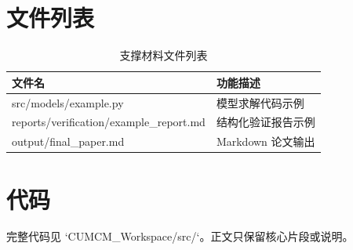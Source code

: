 \documentclass[UTF8,a4paper,12pt]{ctexart}
\begin{document}
\begin{appendices}

\section{文件列表}
\begin{table}[H]
\centering
\caption{支撑材料文件列表}
\begin{tabularx}{\textwidth}{lX}
\toprule
文件名 & 功能描述 \\
\midrule
src/models/example.py & 模型求解代码示例 \\
reports/verification/example_report.md & 结构化验证报告示例 \\
output/final_paper.md & Markdown 论文输出 \\
\bottomrule
\end{tabularx}
\label{tab:file-list}
\end{table}

\section{代码}
完整代码见 `CUMCM_Workspace/src/`。正文只保留核心片段或说明。

\end{appendices}
\end{document}
